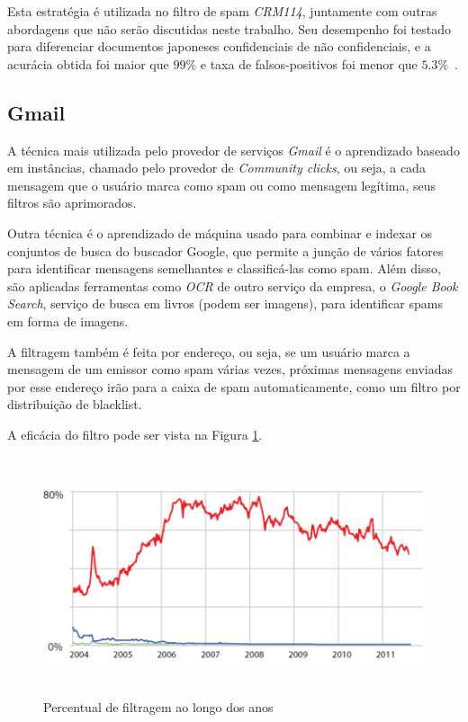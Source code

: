 \documentclass[a4paper,dvipdfm]{article}
\begin{document}
\begin{description}
	Esta estratégia é utilizada no filtro de spam \emph{CRM114}, juntamente com outras abordagens que não serão discutidas neste trabalho. Seu desempenho foi testado para diferenciar documentos japoneses confidenciais de não confidenciais, e a acurácia obtida foi maior que $99\%$ e taxa de falsos-positivos foi menor que $5.3\%$~\cite{fmarkov:japtest}.

	\subsection{Gmail}
		A técnica mais utilizada pelo provedor de serviços \emph{Gmail} é o aprendizado baseado em instâncias, chamado pelo provedor de \emph{Community clicks}, ou seja, a cada mensagem que o usuário marca como spam ou como mensagem legítima, seus filtros são aprimorados.

		Outra técnica é o aprendizado de máquina usado para combinar e indexar os conjuntos de busca do buscador Google, que permite a junção de vários fatores para identificar mensagens semelhantes e classificá-las como spam.
		Além disso, são aplicadas ferramentas como \emph{OCR} de outro serviço da empresa, o \emph{Google Book Search}, serviço de busca em livros (podem ser imagens), para identificar spams em forma de imagens.

		A filtragem também é feita por endereço, ou seja, se um usuário marca a mensagem de um emissor como spam várias vezes, próximas mensagens enviadas por esse endereço irão para a caixa de spam automaticamente, como um filtro por distribuição de blacklist.

		A eficácia do filtro pode ser vista na Figura \ref{gmail:chart}.

		\begin{figure}[ht]
			\centering
			\includegraphics[height=7cm]{Imagens/gmail/spamchart.png}
			\caption{Percentual de filtragem ao longo dos anos}
			\label{gmail:chart}
		\end{figure}
		


\end{description}
\end{document}
